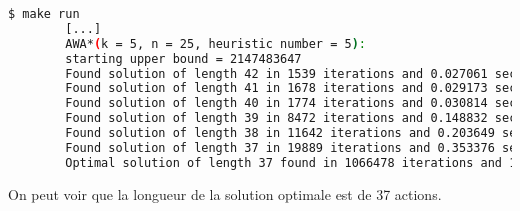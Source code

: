 \begin{minipage}{\dimexpr\linewidth-20pt}
    \begin{lstlisting}[language=bash, caption={Résultats de l'exécution du programme de recherche de plus court chemin avec l'heuristique $h_5$ et \textit{AWA*} pour $k = 5$ piles et $n = 25$ blocs.}, label={lst:plus_court_chemin_results_h4_k4_n20}]
        $ make run
        [...]
        AWA*(k = 5, n = 25, heuristic number = 5): 
        starting upper bound = 2147483647
        Found solution of length 42 in 1539 iterations and 0.027061 seconds, upper bound = 42, weight = 2
        Found solution of length 41 in 1678 iterations and 0.029173 seconds, upper bound = 41, weight = 2
        Found solution of length 40 in 1774 iterations and 0.030814 seconds, upper bound = 40, weight = 2
        Found solution of length 39 in 8472 iterations and 0.148832 seconds, upper bound = 39, weight = 2
        Found solution of length 38 in 11642 iterations and 0.203649 seconds, upper bound = 38, weight = 2
        Found solution of length 37 in 19889 iterations and 0.353376 seconds, upper bound = 37, weight = 2
        Optimal solution of length 37 found in 1066478 iterations and 19.9276 seconds, weight = 2
    \end{lstlisting}
\end{minipage}

On peut voir que la longueur de la solution optimale est de 37 actions.

